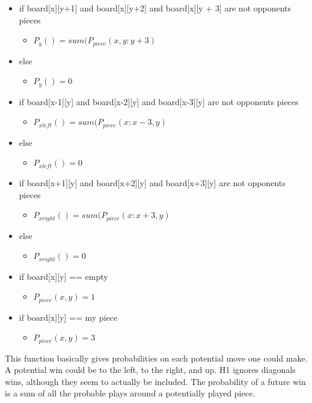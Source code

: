 \documentclass[12pt]{article}
\begin{document}
\pagebreak

\begin{itemize}
	\item if board[x][y+1] and board[x][y+2] and board[x][y + 3] are not opponents pieces
	\begin{itemize}
		\item $P_{y}() = sum(P_{piece}(x,y:y + 3)$
	\end{itemize}
	\item else
	\begin{itemize}
		\item $P_{y}() = 0$
	\end{itemize}
	\item if board[x-1][y] and board[x-2][y] and board[x-3][y] are not opponents pieces
	\begin{itemize}
		\item $P_{x left}() = sum(P_{piece}(x:x-3,y)$
	\end{itemize}
	\item else
	\begin{itemize}
		\item $P_{x left}() = 0$
	\end{itemize}
	\item if board[x+1][y] and board[x+2][y] and board[x+3][y] are not opponents pieces
	\begin{itemize}
		\item $P_{x right}() = sum(P_{piece}(x:x+3,y)$
	\end{itemize}
	\item else
	\begin{itemize}
		\item $P_{x right}() = 0$
	\end{itemize}
	\item if board[x][y] == empty
	\begin{itemize}
		\item $P_{piece}(x,y) = 1$
	\end{itemize}
	\item if board[x][y] == my piece
	\begin{itemize}
		\item $P_{piece}(x,y) = 3$
	\end{itemize}
\end{itemize}

This function basically gives probabilities on each potential move one could make. A potential win could be
to the left, to the right, and up. H1 ignores diagonals wins, although they seem to actually be included.
The probability of a future win is a sum of all the probable plays around a potentially played piece.
\end{document}
